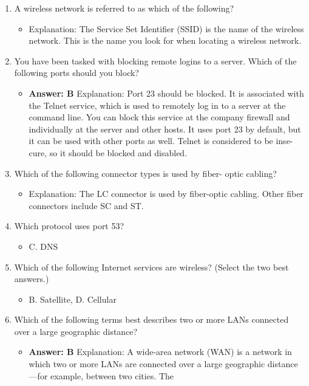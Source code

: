 \documentclass{article}
\begin{document}
\begin{enumerate}
\begin{itemize}
    \end{itemize}
    \item A wireless network is referred to as which of the following?
    \begin{itemize}
        \item Explanation: The Service Set Identifier (SSID) is the name of the wireless network.
This is the name you look for when locating a wireless network.
    \end{itemize}
    \item You have been tasked with blocking remote logins to a server.
Which of the following ports should you block?
    \begin{itemize}
        \item \textbf{Answer: B}
Explanation: Port 23 should be blocked. It is associated with the Telnet service, which
is used to remotely log in to a server at the command line. You can block this service
at the company firewall and individually at the server and other hosts. It uses port 23
by default, but it can be used with other ports as well. Telnet is considered to be inse-
cure, so it should be blocked and disabled.
    \end{itemize}
    \item Which of the following connector types is used by fiber-
optic cabling?
    \begin{itemize}
        \item Explanation: The LC connector is used by fiber-optic cabling. Other fiber connectors
include SC and ST.
    \end{itemize}
    \item Which protocol uses port 53?
    \begin{itemize}
        \item C. DNS
    \end{itemize}
    \item Which of the following Internet services are wireless? (Select the
two best answers.)
    \begin{itemize}
        \item B. Satellite, D. Cellular
    \end{itemize}
    \item Which of the following terms best describes two or more LANs
connected over a large geographic distance?
    \begin{itemize}
        \item \textbf{Answer: B}
Explanation: A wide-area network (WAN) is a network in which two or more LANs are
connected over a large geographic distance—for example, between two cities. The

\end{itemize}
\end{enumerate}
\end{document}
